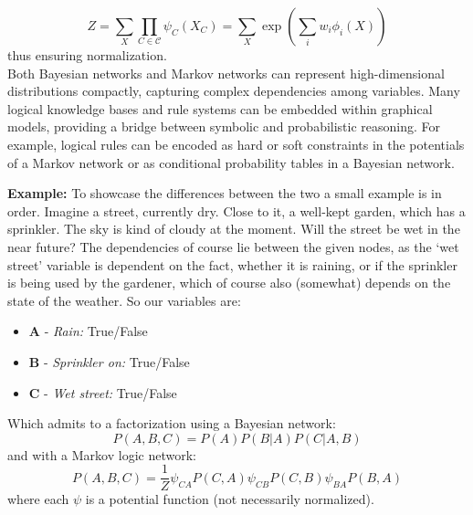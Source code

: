 \documentclass[encoding=utf8,british]{tumphthesis}
\begin{document}
            \begin{equation*}
                Z = \sum_X \prod_{C \in \mathcal{C}} \psi_C(X_C) = \sum_{X} \exp \left( \sum_i w_i \phi_i (X) \right) 
            \end{equation*}
            thus ensuring normalization.
            \\
            Both Bayesian networks and Markov networks can represent high-dimensional distributions compactly, capturing complex dependencies 
            among variables. Many logical knowledge bases and rule systems can be embedded within graphical models, providing a bridge between 
            symbolic and probabilistic reasoning. For example, logical rules can be encoded as hard or soft constraints in the potentials of a 
            Markov network or as conditional probability tables in a Bayesian network.
            
            \textbf{Example:} To showcase the differences between the two a small example is in order. Imagine a street, currently dry.
            Close to it, a well-kept garden, which has a sprinkler. The sky is kind of cloudy at the moment. Will the street be wet in the near future?
            The dependencies of course lie between the given nodes, as the `wet street' variable is dependent on the fact, whether it is raining, or if the 
            sprinkler is being used by the gardener, which of course also (somewhat) depends on the state of the weather. So our variables are:
            \begin{itemize}
                \item \textbf{A} - \textit{Rain:} True/False
                \item \textbf{B} - \textit{Sprinkler on:} True/False
                \item \textbf{C} - \textit{Wet street:} True/False
            \end{itemize}

            Which admits to a factorization using a Bayesian network:
            \begin{equation*}
                P(A, B, C) = P(A)P(B|A)P(C|A, B)
            \end{equation*}
            and with a Markov logic network:
            \begin{equation*}
                P(A, B, C) = \frac{1}{Z} \psi_{CA}P(C, A) \psi_{CB}P(C, B) \psi_{BA}P(B, A)
            \end{equation*}
            where each $\psi$ is a potential function (not necessarily normalized).
\end{document}
